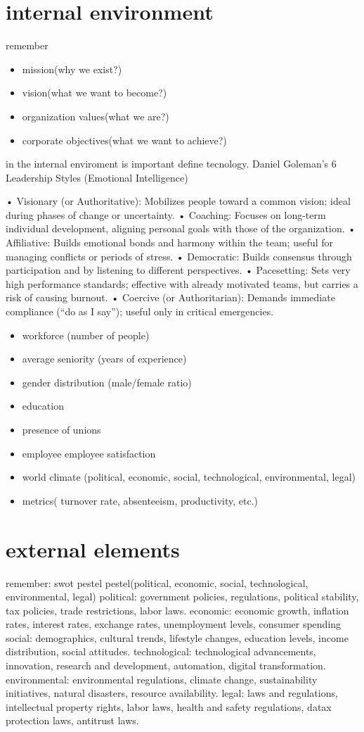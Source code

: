 \documentclass[12pt,a4paper]{report}
\begin{document}
\section{internal environment}
remember
\begin{itemize}
  \item mission(why we exist?)
  \item vision(what we want to become?)
  \item organization values(what we are?)
  \item corporate objectives(what we want to achieve?)
\end{itemize} 
in the internal enviroment is important define tecnology.
Daniel Goleman’s 6 Leadership Styles (Emotional Intelligence)

• Visionary (or Authoritative): Mobilizes people toward a common vision; ideal during phases of change or uncertainty.
• Coaching: Focuses on long-term individual development, aligning personal goals with those of the organization.
• Affiliative: Builds emotional bonds and harmony within the team; useful for managing conflicts or periods of stress.
• Democratic: Builds consensus through participation and by listening to different perspectives.
• Pacesetting: Sets very high performance standards; effective with already motivated teams, but carries a risk of causing burnout.
• Coercive (or Authoritarian): Demands immediate compliance (“do as I say”); useful only in critical emergencies.

\begin{itemize}
  \item workforce (number of people)
  \item average seniority (years of experience)
  \item gender distribution (male/female ratio)
  \item education
  \item presence of unions
  \item employee employee satisfaction
  \item world climate (political, economic, social, technological, environmental, legal)
  \item metrics( turnover rate, absenteeism, productivity, etc.)
\end{itemize}
\section{external elements}
remember: swot pestel
pestel(political, economic, social, technological, environmental, legal)
political: government policies, regulations, political stability, tax policies, trade restrictions, labor laws.
economic: economic growth, inflation rates, interest rates, exchange rates, unemployment levels, consumer spending
social: demographics, cultural trends, lifestyle changes, education levels, income distribution, social attitudes.
technological: technological advancements, innovation, research and development, automation, digital transformation.
environmental: environmental regulations, climate change, sustainability initiatives, natural disasters, resource availability.
legal: laws and regulations, intellectual property rights, labor laws, health and safety regulations, datax protection laws, antitrust laws.
\end{document}
